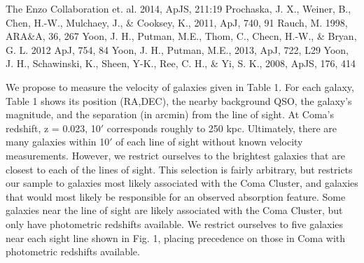 


\begin{references}
\vspace{-0.2cm}
 The Enzo Collaboration et. al. 2014, ApJS, 211:19
 Prochaska, J. X., Weiner, B., Chen, H.-W., Mulchaey, J., \& Cooksey, K., 2011, ApJ, 740, 91
 Rauch, M. 1998, ARA\&A, 36, 267
 Yoon, J. H., Putman, M.E., Thom, C., Checn, H.-W., \& Bryan, G. L. 2012 ApJ, 754, 84
 Yoon, J. H., Putman, M.E., 2013, ApJ, 722, L29
 Yoon, J. H., Schawinski, K., Sheen, Y-K., Ree, C. H., \& Yi, S. K., 2008, ApJS, 176, 414 
\end{references}

%
%

\feasibility
We propose to measure the velocity of galaxies given
in Table 1. For each galaxy, Table 1 shows its position (RA,DEC), the nearby
background QSO, the galaxy's magnitude, and the separation (in arcmin)
from the line of sight. At Coma's
redshift, z = 0.023, 10$'$ corresponds roughly to 250 kpc. Ultimately, there are
many galaxies within 10$'$ of each line of sight without known velocity measurements.
However, we restrict ourselves to the brightest galaxies that are closest
to each of the lines of sight. This selection is fairly arbitrary, but restricts our sample
to galaxies most likely associated with the Coma Cluster, and galaxies that would 
most likely be responsible for an observed absorption feature. Some galaxies near
the line of sight are likely associated with the Coma Cluster, but only have 
photometric redshifts available. We restrict ourselves to five galaxies near each
sight line shown in Fig. 1, placing precedence
on those in Coma with photometric redshifts available.

